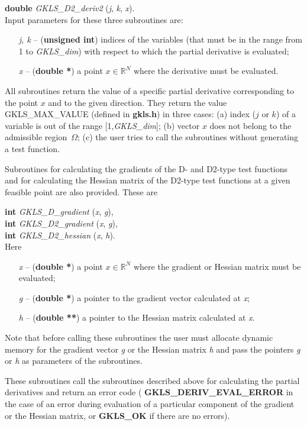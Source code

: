 \documentclass[acmtoms]{acmtrans2m}
\begin{document}
{\bf double} {\it GKLS\_D2\_deriv2} ({\it j}, {\it k}, {\it x}). \\
Input parameters for these three subroutines are:
\begin{itemize}
 \item[\it j, k] -- ({\bf unsigned int}) indices of the variables
 (that must be in the range from 1 to {\it GKLS\_dim}) with respect to
 which the partial derivative is evaluated;
 \item[\it x] -- ({\bf double *}) a point $x \in \mathbb{R} ^N$ where
 the derivative must be evaluated.
\end{itemize}
All subroutines return the value of a specific partial derivative
corresponding to the point $x$ and to the given direction. They
return the value GKLS\_MAX\_VALUE (defined in {\bf gkls.h}) in
three cases: (a) index ($j$ or $k$) of a variable is out of the
range [1,{\it GKLS\_dim}]; (b) vector $x$ does not belong to the
admissible region~$\Omega$; (c) the user tries to call the
subroutines without generating a test function.

Subroutines for calculating the gradients of the D- and D2-type
test functions and for calculating the Hessian matrix of the
D2-type test functions at a given feasible point are also
provided. These are

{\bf int} {\it GKLS\_D\_gradient} ({\it x}, {\it g}), \\

{\bf int} {\it GKLS\_D2\_gradient} ({\it x}, {\it g}), \\

{\bf int} {\it GKLS\_D2\_hessian} ({\it x}, {\it h}). \\
Here
\begin{itemize}
 \item[\it x] -- ({\bf double *}) a point $x \in \mathbb{R} ^N$
 where the gradient or Hessian matrix must be evaluated;
 \item[\it g] -- ({\bf double *}) a pointer to the gradient vector
 calculated at {\it x};
 \item[\it h] -- ({\bf double **}) a pointer to the Hessian matrix
 calculated at {\it x}.
\end{itemize}
Note that before calling these subroutines the user must allocate
dynamic memory for the gradient vector {\it g} or the Hessian
matrix {\it h} and pass the pointers {\it g} or {\it h} as
parameters of the subroutines.

These subroutines call the subroutines described above for
calculating the partial derivatives and return an error code ({\bf
GKLS\_DERIV\_EVAL\_ERROR} in the case of an error during
evaluation of a particular component of the gradient or the
Hessian matrix, or {\bf GKLS\_OK} if there are no errors).
\end{document}
